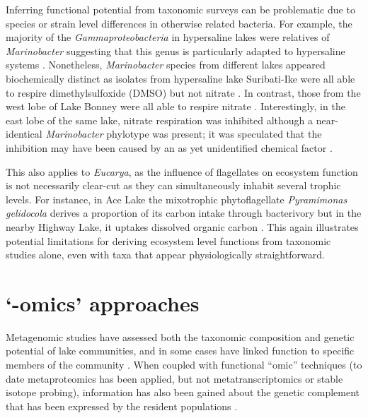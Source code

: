 Inferring functional potential from taxonomic surveys can be problematic due to species or strain level differences in otherwise related bacteria.
For example, the majority of the \emph{Gammaproteobacteria} in hypersaline lakes were relatives of \emph{Marinobacter} suggesting that this genus is particularly adapted to hypersaline systems
\cite{Bowman2000a, Glatz2006, Matsuzaki2006, Mosier2007}.
Nonetheless, \emph{Marinobacter} species from different lakes appeared biochemically distinct
 as isolates from hypersaline lake Suribati-Ike were all able to respire dimethylsulfoxide (DMSO) but not nitrate \cite{Matsuzaki2006}. 
In contrast, those from the west lobe of Lake Bonney were all able to respire nitrate \cite{Ward1997}. 
Interestingly, in the east lobe of the same lake, nitrate respiration was inhibited although a near-identical \emph{Marinobacter} phylotype was present; 
it was speculated that the inhibition may have been caused by an as yet unidentified chemical factor \cite{Ward2005, Glatz2006}. 

This also applies to \emph{Eucarya}, as the influence of flagellates on ecosystem function is not necessarily clear-cut as they can simultaneously inhabit several trophic levels. 
For instance, in Ace Lake the mixotrophic phytoflagellate \emph{Pyramimonas gelidocola} derives a proportion of its carbon intake through bacterivory \cite{Bell2003} 
but in the nearby Highway Lake, it uptakes dissolved organic carbon \cite{Laybourn-Parry2005}. 
This again illustrates potential limitations for deriving ecosystem level functions from taxonomic studies alone, even with taxa that appear physiologically straightforward. 




\section{`-omics' approaches}
Metagenomic studies have assessed both the taxonomic composition and genetic potential of lake communities, and in some cases have linked function to specific members of the community 
\cite{Lopez-Bueno2009, Ng2010, Lauro2011, Yau2011, Varin2012}.%
When coupled with functional ``omic'' techniques (to date metaproteomics has been applied, but not metatranscriptomics or stable isotope probing), 
information has also been gained about the genetic complement that has been expressed by the resident populations \cite{Ng2010}.
